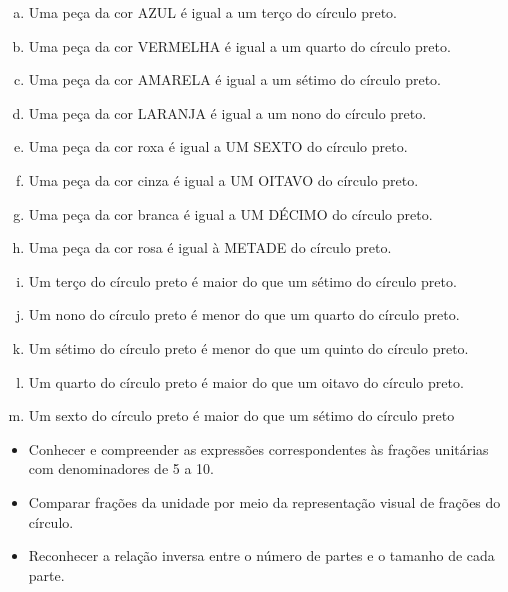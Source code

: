\begin{solucao}{}{}
\begin{enumerate}[a)]
 \item Uma peça da cor AZUL é igual a um terço do círculo preto.
 \item    Uma peça da cor VERMELHA é igual a um quarto do círculo preto.
 \item    Uma peça da cor AMARELA é igual a um sétimo do círculo preto.
 \item    Uma peça da cor LARANJA é igual a um nono do círculo preto.
 \item    Uma peça da cor roxa é igual a UM SEXTO do círculo preto.
 \item    Uma peça da cor cinza é igual a UM OITAVO do círculo preto.
 \item    Uma peça da cor branca é igual a UM DÉCIMO do círculo preto.
 \item    Uma peça da cor rosa é igual à METADE do círculo preto.
 \item    Um terço do círculo preto é maior do que um sétimo do círculo preto.
 \item    Um nono do círculo preto é menor do que um quarto do círculo preto.
 \item    Um sétimo do círculo preto é menor do que um quinto do círculo preto.
 \item    Um quarto do círculo preto é maior do que um oitavo do círculo preto.
 \item    Um sexto do círculo preto é maior do que um sétimo do círculo preto
\end{enumerate}

\end{solucao}

\begin{objetivos}{}{}
  \begin{itemize} %
    \item Conhecer e compreender as expressões correspondentes às frações unitárias com denominadores de 5 a 10.
    \item Comparar frações da unidade por meio da representação visual de frações do círculo.
    \item Reconhecer a relação inversa entre o número de partes e o tamanho de cada parte.
\end{itemize} %
\end{objetivos}


